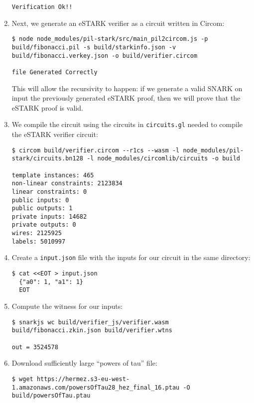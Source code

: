 \begin{enumerate}
\begin{lstlisting}[style=termt]
Verification Ok!!
\end{lstlisting}

\item Next, we generate an eSTARK verifier as a circuit written in Circom:
\begin{lstlisting}[style=termt]
$ node node_modules/pil-stark/src/main_pil2circom.js -p build/fibonacci.pil -s build/starkinfo.json -v build/fibonacci.verkey.json -o build/verifier.circom

file Generated Correctly
\end{lstlisting}
This will allow the recursivity to happen: if we generate a valid SNARK on input the previously generated eSTARK proof, then we will prove that the eSTARK proof is valid.

\item We compile the circuit using the circuits in \texttt{circuits.gl} needed to compile the eSTARK verifier circuit:
\begin{lstlisting}[style=termt]
$ circom build/verifier.circom --r1cs --wasm -l node_modules/pil-stark/circuits.bn128 -l node_modules/circomlib/circuits -o build

template instances: 465
non-linear constraints: 2123834
linear constraints: 0
public inputs: 0
public outputs: 1
private inputs: 14682
private outputs: 0
wires: 2125925
labels: 5010997
\end{lstlisting}

\item Create a \texttt{input.json} file with the inputs for our circuit in the same directory:
\begin{lstlisting}[style=termt]
$ cat <<EOT > input.json
  {"a0": 1, "a1": 1}
  EOT
\end{lstlisting}

\item Compute the witness for our inputs:
\begin{lstlisting}[style=termt]
$ snarkjs wc build/verifier_js/verifier.wasm build/fibonacci.zkin.json build/verifier.wtns

out = 3524578
\end{lstlisting}

\item Download sufficiently large ``powers of tau'' file:
\begin{lstlisting}[style=termt]
$ wget https://hermez.s3-eu-west-1.amazonaws.com/powersOfTau28_hez_final_16.ptau -O build/powersOfTau.ptau
\end{lstlisting}


\end{enumerate}
